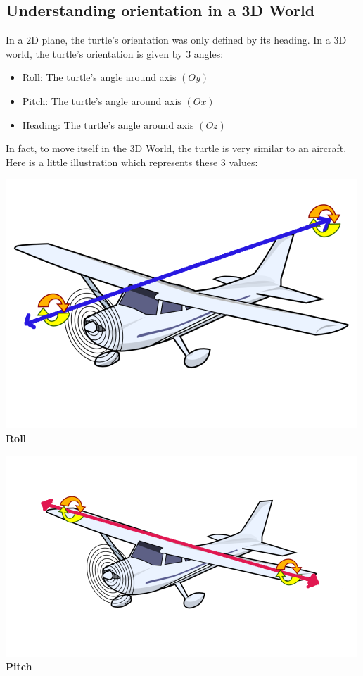 \subsection{Understanding orientation in a 3D World}
In a 2D plane, the turtle's orientation was only defined by its heading. In a 3D world, the turtle's orientation is given by 3 angles:
\begin{itemize}
\item Roll: The turtle's angle around axis $(Oy)$
\item Pitch: The turtle's angle around axis $(Ox)$
\item Heading: The turtle's angle around axis $(Oz)$ 
\end{itemize}
In fact, to move itself in the 3D World, the turtle is very similar to an aircraft. Here is a little illustration which represents these 3 values:\\
\begin{minipage}{5.8cm}
\begin{center}
\includegraphics*[scale=0.3]{pics/plane-roll.png}
\textbf{Roll}
\end{center}
\end{minipage}
\begin{minipage}{5.5cm}
\begin{center}
\includegraphics*[scale=0.35]{pics/plane-pitch.png}
\textbf{Pitch}
\end{center}
\end{minipage}
